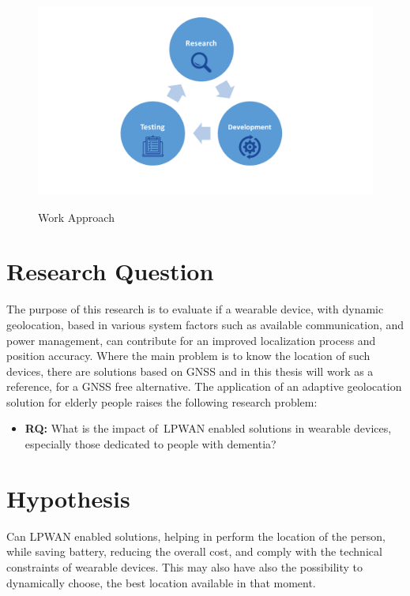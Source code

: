 \begin{figure}[htbp]
  \centering
    {\includegraphics[height=2.5in,width=1\linewidth]{Chapters/Figures/r&d.png}}%
  \caption{Work Approach}
  \label{fig:WorkApp}
\end{figure}


\newpage
\section{Research Question} %
\label{sec:research_question}

The purpose of this research is to evaluate if a wearable device, with dynamic geolocation,  based in various system factors such as available communication, and power management, can contribute for an improved localization process and position accuracy. Where the main problem is to know the location of such devices, there are solutions based on GNSS and in this thesis will work as a reference, for a GNSS free alternative. The application of an adaptive geolocation solution for elderly people raises the following research problem:

\begin{itemize}
	\item \textbf{RQ:} What is the impact of~\gls{LPWAN} enabled solutions in wearable devices, especially those dedicated to people with dementia?
\end{itemize} 

\section{Hypothesis}
\label{sec:hypothesis}

Can LPWAN enabled solutions, helping in perform the location of the person, while saving battery, reducing the overall cost, and comply with the technical constraints of wearable devices. 
This may also have also the possibility to dynamically choose, the best location available in that moment.




